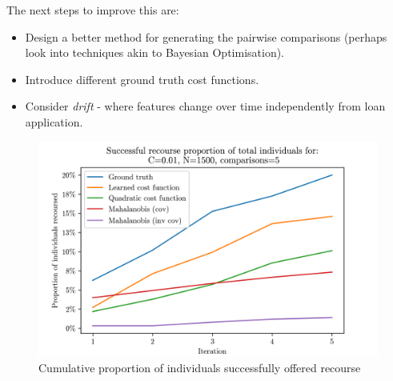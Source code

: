 The next steps to improve this are:
\begin{itemize}
	\item Design a better method for generating the pairwise comparisons (perhaps look into techniques akin to Bayesian Optimisation).
	\item Introduce different ground truth cost functions.
	\item Consider \textit{drift} - where features change over time independently from loan application.
\end{itemize}

\begin{figure}[!htb]
	\centering
	\includegraphics[scale=1]{images/recourse_comparison.png}
	\caption{Cumulative proportion of individuals successfully offered recourse}
	\label{fig:mahanalobis_learning}
\end{figure}
